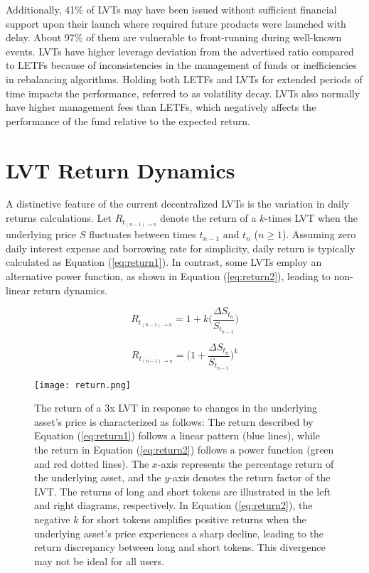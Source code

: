 Additionally, 41\% of LVTs may have been issued without sufficient financial support upon their launch where required future products were launched with delay. About 97\% of them are vulnerable to front-running during well-known events. LVTs have higher leverage deviation from the advertised ratio compared to LETFs because of inconsistencies in the management of funds or inefficiencies in rebalancing algorithms. Holding both LETFs and LVTs for extended periods of time impacts the performance, referred to as volatility decay. LVTs also normally have higher management fees than LETFs, which negatively affects the performance of the fund relative to the expected return.

\section{LVT Return Dynamics}\label{appx:return}
A distinctive feature of the current decentralized LVTs is the variation in daily returns calculations. Let \( R_{t_{(n-1)\to n}} \) denote the return of a \(k\)-times LVT when the underlying price \( S \) fluctuates between times \( t_{n-1} \) and \( t_n \) (\(n \ge 1\)). Assuming zero daily interest expense and borrowing rate for simplicity, daily return is typically calculated as Equation (\ref{eq:return1}). In contrast, some LVTs employ an alternative power function, as shown in Equation (\ref{eq:return2}), leading to non-linear return dynamics.

\noindent
\begin{minipage}{0.5\linewidth}
	\begin{equation}
		R_{t_{(n-1)\to n}}=1+k\Big(\frac{\Delta S_{t_{n}}}{S_{t_{n-1}}}\Big) \label{eq:return1}
	\end{equation}
\end{minipage}
\begin{minipage}{0.5\linewidth}
	\begin{equation}
		R_{t_{(n-1)\to n}}=\Big(1+\frac{\Delta S_{t_{n}}}{S_{t_{n-1}}}\Big)^k \label{eq:return2}
	\end{equation}
\end{minipage}

\begin{figure}[t]
	\texttt{[image: return.png]}
	\caption[LVT return dynamics]{The return of a 3x LVT in response to changes in the underlying asset's price is characterized as follows: The return described by Equation (\ref{eq:return1}) follows a linear pattern (blue lines), while the return in Equation (\ref{eq:return2}) follows a power function (green and red dotted lines). The \(x\)-axis represents the percentage return of the underlying asset, and the \(y\)-axis denotes the return factor of the LVT. The returns of long and short tokens are illustrated in the left and right diagrams, respectively. In Equation (\ref{eq:return2}), the negative \(k\) for short tokens amplifies positive returns when the underlying asset's price experiences a sharp decline, leading to the return discrepancy between long and short tokens. This divergence may not be ideal for all users.}
	\label{fig:return}
\end{figure}

